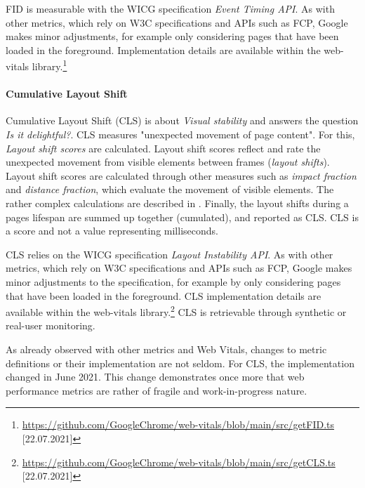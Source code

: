 
FID is measurable with the WICG specification \textit{Event Timing API}.
As with other metrics, which rely on W3C specifications and APIs such as FCP, Google makes minor adjustments, for example only considering pages that have been loaded in the foreground.
Implementation details are available within the web-vitals library.\footnote{\url{https://github.com/GoogleChrome/web-vitals/blob/main/src/getFID.ts} [22.07.2021]}





\paragraph{Cumulative Layout Shift}

Cumulative Layout Shift (CLS) is about \textit{Visual stability} and answers the question \textit{Is it delightful?}.
CLS measures "unexpected movement of page content".
For this, \textit{Layout shift scores} are calculated.
Layout shift scores reflect and rate the unexpected movement from visible elements between frames (\textit{layout shifts}).
Layout shift scores are calculated through other measures such as \textit{impact fraction} and \textit{distance fraction}, which evaluate the movement of visible elements.
The rather complex calculations are described in . %
Finally, the layout shifts during a pages lifespan are summed up together (cumulated), and reported as CLS.
CLS is a score and not a value representing milliseconds.

CLS relies on the WICG specification \textit{Layout Instability API}.
As with other metrics, which rely on W3C specifications and APIs such as FCP, Google makes minor adjustments to the specification, for example by only considering pages that have been loaded in the foreground.
CLS implementation details are available within the web-vitals library.\footnote{\url{https://github.com/GoogleChrome/web-vitals/blob/main/src/getCLS.ts} [22.07.2021]}
CLS is retrievable through synthetic or real-user monitoring.



As already observed with other metrics and Web Vitals, changes to metric definitions or their implementation are not seldom.
For CLS, the implementation changed in June 2021. %
This change demonstrates once more that web performance metrics are rather of fragile and work-in-progress nature.


